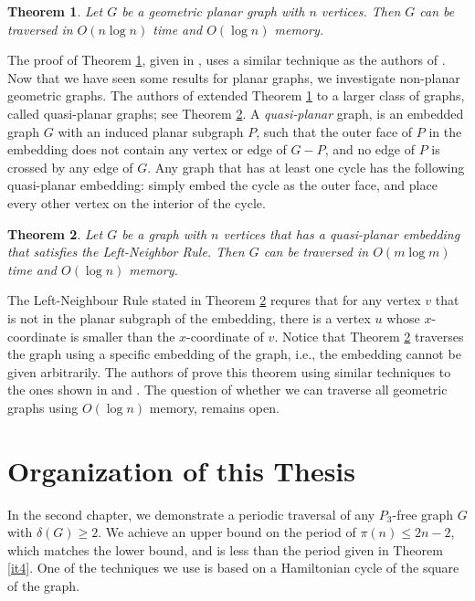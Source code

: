 \documentclass[12pt,letterpaper,oneside]{book}
\newtheorem{theorem}{Theorem}[section]
\begin{document}
\begin{theorem}\label{lgn}
\emph{\cite{BM}}  Let $G$ be a geometric planar graph with $n$ vertices.  Then $G$ can be traversed 
in $O(n\log n)$ time and $O(\log n)$ memory.  
\end{theorem} 

The proof of Theorem \ref{lgn}, given in \cite{BM}, uses a similar technique as the authors of \cite{BKOO}.  
Now that we have seen some results for planar graphs, we investigate non-planar geometric graphs.  
The authors of \cite{CDKOSU} extended Theorem \ref{lgn} to a  
larger class of graphs, called quasi-planar graphs; see Theorem \ref{xt}.  A \emph{quasi-planar} graph, is an embedded 
graph $G$ 
with an induced planar subgraph $P$, such that the outer face of $P$ in the embedding does not contain any vertex or edge of 
$G-P$, and no edge of $P$ is crossed by any edge of $G$.  Any graph that has at least one cycle has the 
following quasi-planar embedding: simply 
embed the cycle as the outer face, and place every other vertex on the interior of the cycle.  



\begin{theorem}\label{xt}
\emph{\cite{CDKOSU}}  Let $G$ be a graph 
with $n$ vertices that has a quasi-planar embedding that satisfies the Left-Neighbor Rule.  Then $G$ can be traversed 
in $O(m\log m)$ time and $O(\log n)$ memory.  
\end{theorem}

The Left-Neighbour Rule stated in Theorem \ref{xt} requres that for any vertex $v$ that is not 
in the planar subgraph of the embedding, there is a vertex $u$ whose $x$-coordinate is smaller than the $x$-coordinate of $v$.  
Notice that Theorem \ref{xt} traverses the graph using a specific embedding of the graph, i.e., the embedding cannot 
be given arbitrarily.  
The authors of \cite{CDKOSU} prove this theorem using similar techniques to the ones shown in \cite{BM} and \cite{BKOO}.  The question of 
whether we can traverse all geometric graphs using $O(\log n)$ memory, remains open. 




\newpage
\section{Organization of this Thesis}

In the second chapter, we demonstrate a periodic traversal of any $P_3$-free graph $G$ with $\delta(G)\ge 2$.  
We achieve an upper bound on the 
period of $\pi(n)\le 2n-2$, which matches the lower bound, and is less than the 
period given in Theorem \ref{it4}.  One of the techniques we use is based on a Hamiltonian cycle of the square of the graph.  
\end{document}

